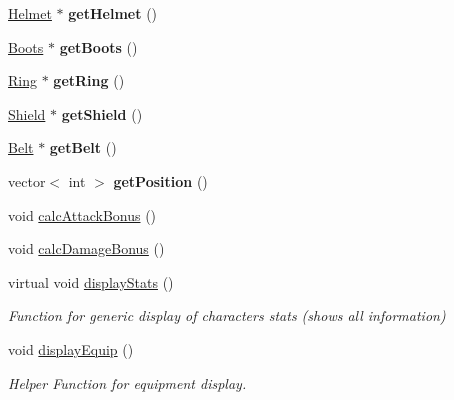 \begin{DoxyCompactItemize}
\hyperlink{class_helmet}{Helmet} $\ast$ {\bfseries get\+Helmet} ()
\item 
\hypertarget{class_characters_a93d02cbc7494a7fe7abe1d3a4fcc9b42}{}\label{class_characters_a93d02cbc7494a7fe7abe1d3a4fcc9b42} 
\hyperlink{class_boots}{Boots} $\ast$ {\bfseries get\+Boots} ()
\item 
\hypertarget{class_characters_ace71da180996d5101a30ebfc2aca8a79}{}\label{class_characters_ace71da180996d5101a30ebfc2aca8a79} 
\hyperlink{class_ring}{Ring} $\ast$ {\bfseries get\+Ring} ()
\item 
\hypertarget{class_characters_a2d01b90239043a157c56e625b78017cd}{}\label{class_characters_a2d01b90239043a157c56e625b78017cd} 
\hyperlink{class_shield}{Shield} $\ast$ {\bfseries get\+Shield} ()
\item 
\hypertarget{class_characters_a0f32959981f93b31889eed35f257f4c6}{}\label{class_characters_a0f32959981f93b31889eed35f257f4c6} 
\hyperlink{class_belt}{Belt} $\ast$ {\bfseries get\+Belt} ()
\item 
\hypertarget{class_characters_aea3ce859280087ef57932ff212d96749}{}\label{class_characters_aea3ce859280087ef57932ff212d96749} 
vector$<$ int $>$ {\bfseries get\+Position} ()
\item 
void \hyperlink{class_characters_aafcca03cc72ce2b389c0412229864c6e}{calc\+Attack\+Bonus} ()
\item 
void \hyperlink{class_characters_af750209704e0be8b911cbc29fc1362ee}{calc\+Damage\+Bonus} ()
\item 
\hypertarget{class_characters_adc5a2d1c1aabab2b9915f5ce0e2707f9}{}\label{class_characters_adc5a2d1c1aabab2b9915f5ce0e2707f9} 
virtual void \hyperlink{class_characters_adc5a2d1c1aabab2b9915f5ce0e2707f9}{display\+Stats} ()
\begin{DoxyCompactList}\small\item\em Function for generic display of character\textquotesingle{}s stats (shows all information) \end{DoxyCompactList}\item 
\hypertarget{class_characters_acf1c5f4228c0ac33361c0ad5211aa7a9}{}\label{class_characters_acf1c5f4228c0ac33361c0ad5211aa7a9} 
void \hyperlink{class_characters_acf1c5f4228c0ac33361c0ad5211aa7a9}{display\+Equip} ()
\begin{DoxyCompactList}\small\item\em Helper Function for equipment display. \end{DoxyCompactList}\item 
\hypertarget{class_characters_ad40703d40e67cf8d99e4de9624c1ba8a}{}\label{class_characters_ad40703d40e67cf8d99e4de9624c1ba8a} 

\end{DoxyCompactItemize}
